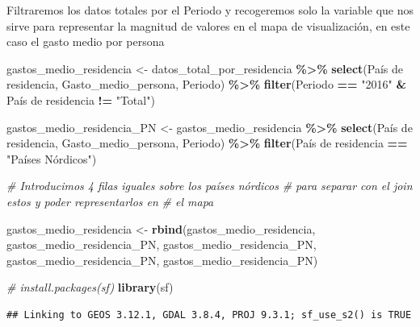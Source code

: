 \documentclass[data,article,submit,moreauthors,pdftex]{Definitions/mdpi}
\newenvironment{Shaded}{\begin{snugshade}}{\end{snugshade}}
\newcommand{\AttributeTok}[1]{\textcolor[rgb]{0.13,0.29,0.53}{#1}}
\newcommand{\CommentTok}[1]{\textcolor[rgb]{0.56,0.35,0.01}{\textit{#1}}}
\newcommand{\FunctionTok}[1]{\textcolor[rgb]{0.13,0.29,0.53}{\textbf{#1}}}
\newcommand{\NormalTok}[1]{#1}
\newcommand{\OtherTok}[1]{\textcolor[rgb]{0.56,0.35,0.01}{#1}}
\newcommand{\SpecialCharTok}[1]{\textcolor[rgb]{0.81,0.36,0.00}{\textbf{#1}}}
\newcommand{\StringTok}[1]{\textcolor[rgb]{0.31,0.60,0.02}{#1}}
\begin{document}
Filtraremos los datos totales por el Periodo y recogeremos solo la
variable que nos sirve para representar la magnitud de valores en el
mapa de visualización, en este caso el gasto medio por persona

\begin{Shaded}
\begin{Highlighting}[]
\NormalTok{gastos\_medio\_residencia }\OtherTok{\textless{}{-}}\NormalTok{ datos\_total\_por\_residencia }\SpecialCharTok{\%\textgreater{}\%}
    \FunctionTok{select}\NormalTok{(}\StringTok{\textasciigrave{}}\AttributeTok{País de residencia}\StringTok{\textasciigrave{}}\NormalTok{, Gasto\_medio\_persona, Periodo) }\SpecialCharTok{\%\textgreater{}\%}
    \FunctionTok{filter}\NormalTok{(Periodo }\SpecialCharTok{==} \StringTok{"2016"} \SpecialCharTok{\&} \StringTok{\textasciigrave{}}\AttributeTok{País de residencia}\StringTok{\textasciigrave{}} \SpecialCharTok{!=} \StringTok{"Total"}\NormalTok{)}

\NormalTok{gastos\_medio\_residencia\_PN }\OtherTok{\textless{}{-}}\NormalTok{ gastos\_medio\_residencia }\SpecialCharTok{\%\textgreater{}\%}
    \FunctionTok{select}\NormalTok{(}\StringTok{\textasciigrave{}}\AttributeTok{País de residencia}\StringTok{\textasciigrave{}}\NormalTok{, Gasto\_medio\_persona, Periodo) }\SpecialCharTok{\%\textgreater{}\%}
    \FunctionTok{filter}\NormalTok{(}\StringTok{\textasciigrave{}}\AttributeTok{País de residencia}\StringTok{\textasciigrave{}} \SpecialCharTok{==} \StringTok{"Países Nórdicos"}\NormalTok{)}

\CommentTok{\# Introducimos 4 filas iguales sobre los países nórdicos}
\CommentTok{\# para separar con el join estos y poder representarlos en}
\CommentTok{\# el mapa}

\NormalTok{gastos\_medio\_residencia }\OtherTok{\textless{}{-}} \FunctionTok{rbind}\NormalTok{(gastos\_medio\_residencia, gastos\_medio\_residencia\_PN,}
\NormalTok{    gastos\_medio\_residencia\_PN, gastos\_medio\_residencia\_PN, gastos\_medio\_residencia\_PN)}

\CommentTok{\# install.packages(\textquotesingle{}sf\textquotesingle{})}
\FunctionTok{library}\NormalTok{(sf)}
\end{Highlighting}
\end{Shaded}

\begin{verbatim}
## Linking to GEOS 3.12.1, GDAL 3.8.4, PROJ 9.3.1; sf_use_s2() is TRUE
\end{verbatim}
\end{document}
